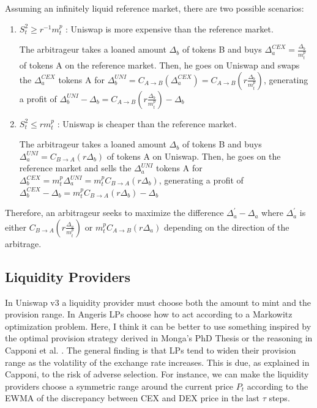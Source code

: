 \documentclass[a4paper,11pt]{article}
\begin{document}
Assuming an infinitely liquid reference market, there are two possible scenarios:   
\begin{enumerate}
    \item $S^2_t \geq {r^{-1}}m^p_t$ : Uniswap is more expensive than the reference market.
    
    The arbitrageur takes a loaned amount $\Delta_{b}$ of tokens B and buys $\Delta_a^{CEX}=\frac{\Delta_{b}}{m^p_t}$ of tokens A on the reference market. Then, he goes on Uniswap and swaps the $\Delta_a^{CEX}$ tokens A for $\Delta_{b}^{UNI} = C_{A\to B}(\Delta_a^{CEX}) = C_{A\to B}(r \frac{\Delta_{b}}{m^p_t})$, generating a profit of $\Delta_{b}^{UNI}-\Delta_b = C_{A\to B}(r \frac{\Delta_{b}}{m^p_t})-\Delta_b$

    \item $S^2_t \leq r m^p_t$ : Uniswap is cheaper than the reference market.
    
    The arbitrageur takes a loaned amount $\Delta_{b}$ of tokens B and buys $\Delta_a^{UNI} = C_{B\to A}(r\Delta_b)$ of tokens A on Uniswap. Then, he goes on the reference market and sells the $\Delta_a^{UNI}$ tokens A for $\Delta_{b}^{CEX}=m^p_t\Delta_{a}^{UNI}=m^p_t C_{B\to A}(r\Delta_b)$, generating a profit of $\Delta_{b}^{CEX}-\Delta_b = m^p_t C_{B\to A}(r\Delta_b)-\Delta_b$
\end{enumerate}
Therefore, an arbitrageur seeks to maximize the difference $\Delta_{a}^{'} - \Delta_a$ where $\Delta_a^{'}$ is either $C_{B\to A}(r \frac{\Delta_{a}}{m^p_t})$ or $m^p_tC_{A\to B}(r\Delta_a)$ depending on the direction of the arbitrage.

\subsection{Liquidity Providers}
In Uniswap v3 a liquidity provider must choose both the amount to mint and the provision range. In Angeris LPs choose how to act according to a Markowitz optimization problem. Here, I think it can be better to use something inspired by the optimal provision strategy derived in Monga’s PhD Thesis \cite{monga2024automatedmarketmakingdecentralized} or the reasoning in Capponi et al. \cite{capponi2021liquidity}.  The general finding is that LPs tend to widen their provision range as the volatility of the exchange rate increases. This is due, as explained in Capponi, to the risk of adverse selection. For instance, we can make the liquidity providers choose a symmetric range around the current price $P_t$ according to the EWMA of the discrepancy between CEX and DEX price in the last $\tau$ steps.
\end{document}
